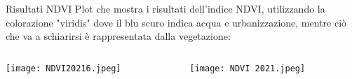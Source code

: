 \documentclass{beamer} %
\begin{document}
        \begin{frame}{Risultati NDVI}
Plot che mostra i risultati dell'indice NDVI, utilizzando la colorazione "viridis" dove il blu scuro indica acqua e urbanizzazione, mentre ciò che va a schiarirsi è rappresentata dalla vegetazione:
\bigskip
\begin{columns}
    \begin{column}{0.6\textwidth}
    \begin{center}
        \texttt{[image: NDVI20216.jpeg]}
        \caption{NDVI 2016}
        \end{center}
\end{column}
\begin{column}{0.6\textwidth}
\begin{center}
\texttt{[image: NDVI 2021.jpeg]}
\caption{NDVI 2021}
\end{center}
\end{column}
\end{columns}
     \end{frame}
\end{document}
